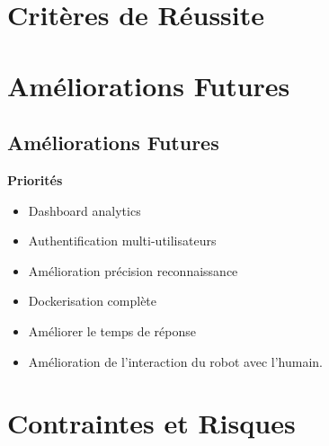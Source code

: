 \documentclass[12pt,a4paper]{article}
\newenvironment{block}[1]{\begin{center}\begin{minipage}{0.9\textwidth}\textbf{#1}\\}{\end{minipage}\end{center}}
\begin{document}

\section{Critères de Réussite}



\section{Améliorations Futures}

\subsection{Améliorations Futures}

\begin{block}{Priorités}
\begin{itemize}
    \item[\textcolor{successgreen}{\faCheckSquare}] Dashboard analytics
    \item[\textcolor{successgreen}{\faCheckSquare}] Authentification multi-utilisateurs
    \item[\textcolor{successgreen}{\faCheckSquare}] Amélioration précision reconnaissance
    \item[\textcolor{successgreen}{\faCheckSquare}] Dockerisation complète
    \item[\textcolor{successgreen}{\faCheckSquare}] Améliorer le temps de réponse
    \item[\textcolor{successgreen}{\faCheckSquare}] Amélioration de l'interaction du robot avec l'humain.
\end{itemize}
\end{block}


\section{Contraintes et Risques}
\end{document}
